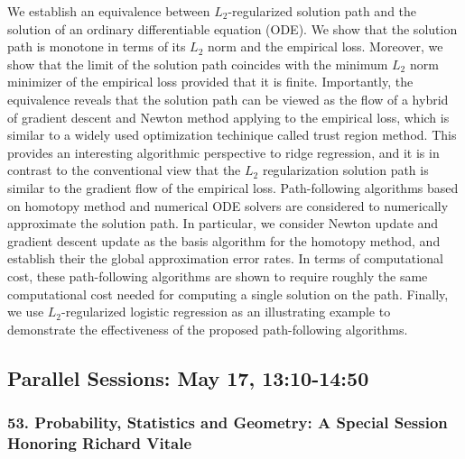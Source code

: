 \begin{itemize}
We establish an equivalence between $L_2$-regularized solution path and the solution of an ordinary differentiable equation (ODE). We show that the solution path is monotone in terms of its $L_2$ norm and the empirical loss. Moreover, we show that the limit of the solution path coincides with the minimum $L_2$ norm minimizer of the empirical loss provided that it is finite. Importantly, the equivalence reveals that the solution path can be viewed as the flow of a hybrid of gradient descent and Newton method applying to the empirical loss, which is similar to a widely used optimization techinique called trust region method. This provides an interesting algorithmic perspective to ridge regression, and it is in contrast to the conventional view that the $L_2$ regularization solution path is similar to the gradient flow of the empirical loss. Path-following algorithms based on homotopy method and numerical ODE solvers are considered to numerically approximate the solution path. In particular, we consider Newton update and gradient descent update as the basis algorithm for the homotopy method, and establish their the global approximation error rates. In terms of computational cost, these path-following algorithms are shown to require roughly the same computational cost needed for computing a single solution on the path. Finally, we use $L_2$-regularized logistic regression as an illustrating example to demonstrate the effectiveness of the proposed path-following algorithms.

\end{itemize}

\subsection*{Parallel Sessions: May 17, 13:10-14:50}

\subsubsection*{53. Probability, Statistics and Geometry: A Special Session Honoring Richard Vitale}

